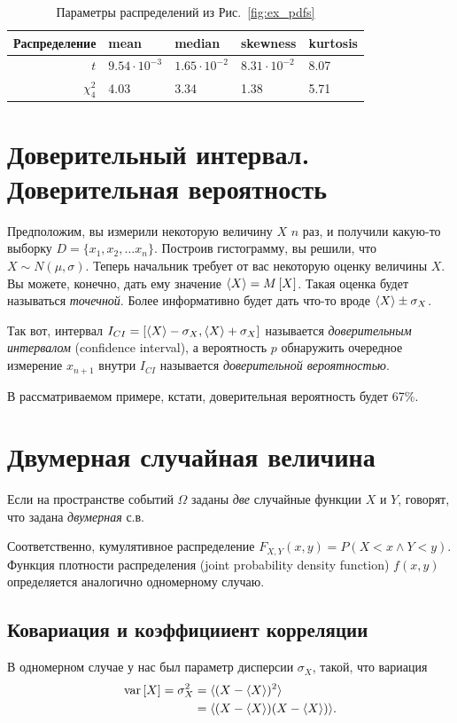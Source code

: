 \documentclass{report}
\newcommand{\var}[1]{\mathrm{var}\left[{#1}\right]}
\begin{document}
\begin{table}
	\caption{Параметры распределений из Рис.~\ref{fig:ex_pdfs}\label{tbl:ex_pdfs}}
	\begin{tabular}{r|l|l|l|l}\hline
		Распределение & mean & median & skewness & kurtosis \\\hline
		$t$ & $9.54\cdot 10^{-3}$ & $1.65\cdot 10^{-2}$ & $8.31\cdot 10^{-2}$ & 8.07\\
		$\chi^2_4$ & 4.03 & 3.34 & 1.38 & 5.71 \\\hline
	\end{tabular}
\end{table}

\section{Доверительный интервал. Доверительная вероятность}
Предположим, вы измерили некоторую величину $X$ $n$ раз, и получили какую-то выборку $D = \{x_1, x_2, \dots x_n\}$. Построив гистограмму, вы решили, что  $X\sim N(\mu, \sigma)$. Теперь начальник требует от вас некоторую оценку величины $X$. Вы можете, конечно, дать ему значение $\langle{X}\rangle = M\left[X\right]$. Такая оценка будет называться \emph{точечной}. Более информативно будет дать что-то вроде $\langle{X}\rangle \pm \sigma_X$.

Так вот, интервал $I_{CI} = \left[\langle{X}\rangle - \sigma_X, \langle{X}\rangle + \sigma_X\right]$ называется \emph{доверительным интервалом} (confidence interval), а вероятность $p$ обнаружить очередное измерение $x_{n+1}$ внутри $I_{CI}$
называется \emph{доверительной вероятностью}. 
\begin{rmk}
	В рассматриваемом примере, кстати, доверительная вероятность будет 67\%.
\end{rmk}

\section{Двумерная случайная величина}
Если на пространстве событий $\Omega$ заданы \emph{две} случайные функции $X$ и $Y$, говорят, что задана \emph{двумерная} с.в.

Соответственно, кумулятивное распределение ${F_{X,Y}(x,y) = P(X<x\wedge Y<y)}$. Функция плотности распределения (joint probability density function) $f(x,y)$ определяется аналогично одномерному случаю.

\subsection{Ковариация и коэффицииент корреляции}
В одномерном случае у нас был параметр дисперсии $\sigma_X$, такой, что вариация 
\begin{align*}
\var{X} = \sigma^2_X &= \avg{(X-\avg{X})^2} \\
 &= \avg{(X-\avg{X})(X-\avg{X})}.
\end{align*}
\end{document}
